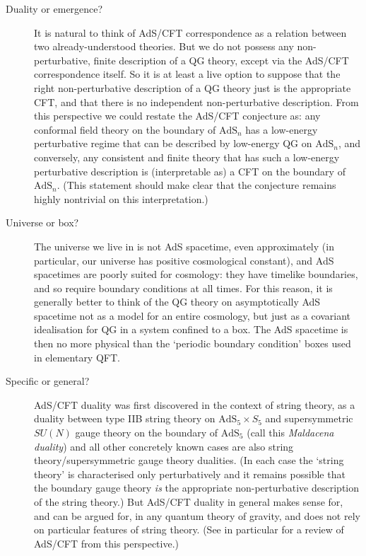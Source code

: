 \documentclass{article}
\newcommand{\AdS}{\mathrm{AdS}}
\begin{document}
\begin{description}
\item[Duality or emergence?] It is natural to think of AdS/CFT correspondence as a relation between two already-understood theories. But we do not possess any non-perturbative, finite description of a QG theory, except via the AdS/CFT correspondence itself. So it is at least a live option to suppose that the right non-perturbative description of a QG theory just is the appropriate CFT, and that there is no independent non-perturbative description. From this perspective we could restate the AdS/CFT conjecture as: any conformal field theory on the boundary of $\AdS_n$ has a low-energy perturbative regime that can be described by low-energy QG on $\AdS_n$, and conversely, any consistent and finite theory that has such a low-energy perturbative description is (interpretable as) a CFT on the boundary of $\AdS_n$. (This statement should make clear that the conjecture remains highly nontrivial on this interpretation.)
\item[Universe or box?] The universe we live in is not AdS spacetime, even approximately (in particular, our universe has positive cosmological constant), and AdS spacetimes are poorly suited for cosmology: they have timelike boundaries, and so require boundary conditions at all times. For this reason, it is generally better to think of the QG theory on asymptotically AdS spacetime not as a model for an entire cosmology, but just as a covariant idealisation for QG in a system confined to a box. The AdS spacetime is then no more physical than the `periodic boundary condition' boxes used in elementary QFT.
\item[Specific or general?] AdS/CFT duality was first discovered  in the context of string theory, as a duality between type IIB string theory on $\AdS_5 \times S_5$ and supersymmetric $SU(N)$ gauge theory on the boundary of $\AdS_5$ (call this \emph{Maldacena duality}) and  all other concretely known cases are also string theory/supersymmetric gauge theory dualities. (In each case the `string theory' is characterised only perturbatively and it remains possible that the boundary gauge theory \emph{is} the appropriate non-perturbative description of the string theory.) But AdS/CFT duality in general makes sense for, and can be argued for, in any quantum theory of gravity, and does not rely on particular features of string theory. (See in particular  for a review of AdS/CFT from this perspective.)
\end{description}
\end{document}
